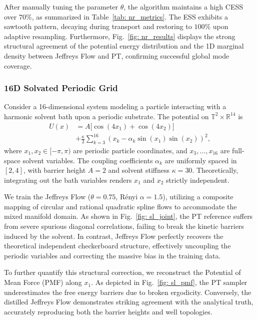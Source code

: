 \documentclass[%
 reprint,
 amsmath,amssymb,
 aps,
 pre,
]{revtex4-2}
\begin{document}
After manually tuning the parameter $\theta$, the algorithm maintains a high CESS over $70\%$, as summarized in Table~\ref{tab: nr_metrics}. The ESS exhibits a sawtooth pattern, decaying during transport and restoring to $100\%$ upon adaptive resampling. Furthermore, Fig.~\ref{fig: nr_results} displays the strong structural agreement of the potential energy distribution and the 1D marginal density between Jeffreys Flow and PT, confirming successful global mode coverage.

\subsubsection*{16D Solvated Periodic Grid}

Consider a 16-dimensional system modeling a particle interacting with a harmonic solvent bath upon a periodic substrate. The potential on $\mathbb{T}^2 \times \mathbb{R}^{14}$ is
\begin{align*}
	U(x) & = A \big[ \cos(4x_1) + \cos(4x_2) \big] \\
	& + \frac{\kappa}{2} \sum_{k=3}^{16} (x_k - \alpha_k \sin(x_1) \sin(x_2))^2,
\end{align*}
where $x_1, x_2 \in [-\pi, \pi)$ are periodic particle coordinates, and $x_3, \ldots, x_{16}$ are full-space solvent variables. The coupling coefficients $\alpha_k$ are uniformly spaced in $[2, 4]$, with barrier height $A=2$ and solvent stiffness $\kappa=30$. Theoretically, integrating out the bath variables renders $x_1$ and $x_2$ strictly independent.

We train the Jeffreys Flow ($\theta = 0.75$, R\'enyi $\alpha=1.5$), utilizing a composite mapping of circular and rational quadratic spline flows to accommodate the mixed manifold domain. As shown in Fig.~\ref{fig: sl_joint}, the PT reference suffers from severe spurious diagonal correlations, failing to break the kinetic barriers induced by the solvent. In contrast, Jeffreys Flow perfectly recovers the theoretical independent checkerboard structure, effectively uncoupling the periodic variables and correcting the massive bias in the training data.

To further quantify this structural correction, we reconstruct the Potential of Mean Force (PMF) along $x_1$. As depicted in Fig.~\ref{fig: sl_pmf}, the PT sampler underestimates the free energy barriers due to broken ergodicity. Conversely, the distilled Jeffreys Flow demonstrates striking agreement with the analytical truth, accurately reproducing both the barrier heights and well topologies.
\end{document}
